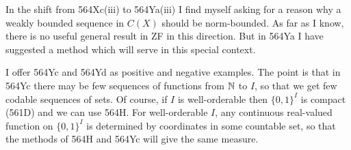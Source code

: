 {In the shift from 564Xc(iii) to 564Ya(iii) I find myself asking for a
reason why a weakly bounded sequence in $C(X)$ should be norm-bounded.
As far as I know, there is no useful general result in ZF in this
direction.   But in 564Ya I have suggested a method which will serve in
this special context.

I offer 564Yc and 564Yd as positive and negative examples.   The point is
that in 564Yc there may be few sequences of
functions from $\Bbb N$ to $I$, so that we get few codable sequences of
sets.   Of course, if $I$ is well-orderable then $\{0,1\}^I$ is compact
(561D) and we can use 564H.   For well-orderable $I$,
any continuous
real-valued function on $\{0,1\}^I$ is determined by coordinates in some
countable set, so that the methods of 564H and 564Yc will give the same
measure.
}%

\discrpage

